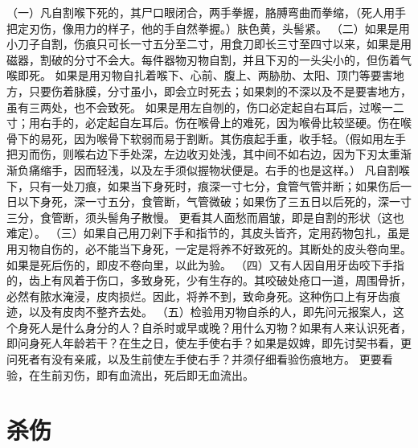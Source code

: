 \documentclass[12pt,UTF8]{ctexbook}
\begin{document}
（一）凡自割喉下死的，其尸口眼闭合，两手拳握，胳膊弯曲而拳缩，（死人用手把定刃伤，像用力的样子，他的手自然拳握。）肤色黄，头髻紧。
（二）如果是用小刀子自割，伤痕只可长一寸五分至二寸，用食刀即长三寸至四寸以来，如果是用磁器，割破的分寸不会大。每件器物刃物自割，并且下刃的一头尖小的，但伤着气喉即死。
如果是用刃物自扎着喉下、心前、腹上、两胁肋、太阳、顶门等要害地方，只要伤着脉膜，分寸虽小，即会立时死去；如果刺的不深以及不是要害地方，虽有三两处，也不会致死。
如果是用左自刎的，伤口必定起自右耳后，过喉一二寸；用右手的，必定起自左耳后。伤在喉骨上的难死，因为喉骨比较坚硬。伤在喉骨下的易死，因为喉骨下软弱而易于割断。其伤痕起手重，收手轻。（假如用左手把刃而伤，则喉右边下手处深，左边收刃处浅，其中间不如右边，因为下刃太重渐渐负痛缩手，因而轻浅，以及左手须似握物状便是。右手的也是这样。）
凡自割喉下，只有一处刀痕，如果当下身死时，痕深一寸七分，食管气管并断；如果伤后一日以下身死，深一寸五分，食管断，气管微破；如果伤了三五日以后死的，深一寸三分，食管断，须头髻角子散慢。
更看其人面愁而眉皱，即是自割的形状（这也难定）。
（三）如果自己用刀剁下手和指节的，其皮头皆齐，定用药物包扎，虽是用刃物自伤的，必不能当下身死，一定是将养不好致死的。其断处的皮头卷向里。如果是死后伤的，即皮不卷向里，以此为验。
（四）又有人因自用牙齿咬下手指的，齿上有风着于伤口，多致身死，少有生存的。其咬破处疮口一道，周围骨折，必然有脓水淹浸，皮肉损烂。因此，将养不到，致命身死。这种伤口上有牙齿痕迹，以及有皮肉不整齐去处。
（五）检验用刃物自杀的人，即先问元报案人，这个身死人是什么身分的人？自杀时或早或晚？用什么刃物？如果有人来认识死者，即问身死人年龄若干？在生之日，使左手使右手？如果是奴婢，即先讨契书看，更问死者有没有亲戚，以及生前使左手使右手？并须仔细看验伤痕地方。
更要看验，在生前刃伤，即有血流出，死后即无血流出。


\chapter{杀伤}
\end{document}
